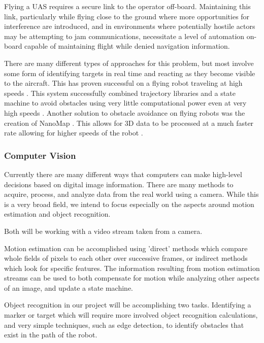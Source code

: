 \documentclass{article}
\begin{document}
		Flying a UAS requires a secure link to the operator off-board. Maintaining this link, particularly while flying close to the ground where more opportunities for interference are introduced, and in environments where potentially hostile actors may be attempting to jam communications, necessitate a level of automation on-board capable of maintaining flight while denied navigation information.
		
		There are many different types of approaches for this problem, but most involve some form of identifying targets in real time and reacting as they become visible to the aircraft. This has proven successful on a flying robot traveling at high speeds \cite{barry2015pushbroom}. This system successfully combined trajectory libraries and a state machine to avoid obstacles using very little computational power even at very high speeds \cite{barry2018high}. Another solution to obstacle avoidance on flying robots was the creation of NanoMap \cite{2018nanomap}. This allows for 3D data to be processed at a much faster rate allowing for higher speeds of the robot \cite{2018nanomap}.
		
		\subsubsection{Computer Vision}
		
		Currently there are many different ways that computers can make high-level decisions based on digital image information. There are many methods to acquire, process, and analyze data from the real world using a camera. While this is a very broad field, we intend to focus especially on the aspects around motion estimation and object recognition.
		
		Both will be working with a video stream taken from a camera. 
		
		Motion estimation can be accomplished using 'direct' methods which compare whole fields of pixels to each other over successive frames, or indirect methods which look for specific features. The information resulting from motion estimation streams can be used to both compensate for motion while analyzing other aspects of an image, and update a state machine.
		
		Object recognition in our project will be accomplishing two tasks. Identifying a marker or target which will require more involved object recognition calculations, and very simple techniques, such as edge detection, to identify obstacles that exist in the path of the robot.
		
\end{document}
